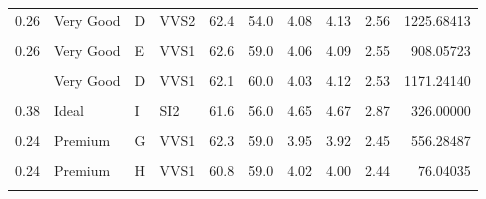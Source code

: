 \documentclass[
]{article}
\begin{document}
\begin{table}[!h]
{\begin{tabular}[t]{rlllrrrrrr}
0.26 & Very Good & D & VVS2 & 62.4 & 54.0 & 4.08 & 4.13 & 2.56 & 1225.68413\\
\cellcolor{gray!6}{0.26} & \cellcolor{gray!6}{Very Good} & \cellcolor{gray!6}{D} & \cellcolor{gray!6}{VVS2} & \cellcolor{gray!6}{62.8} & \cellcolor{gray!6}{60.0} & \cellcolor{gray!6}{4.01} & \cellcolor{gray!6}{4.05} & \cellcolor{gray!6}{2.53} & \cellcolor{gray!6}{1098.26967}\\
0.26 & Very Good & E & VVS1 & 62.6 & 59.0 & 4.06 & 4.09 & 2.55 & 908.05723\\
\cellcolor{gray!6}{0.26} & \cellcolor{gray!6}{Very Good} & \cellcolor{gray!6}{E} & \cellcolor{gray!6}{VVS1} & \cellcolor{gray!6}{63.4} & \cellcolor{gray!6}{59.0} & \cellcolor{gray!6}{4.00} & \cellcolor{gray!6}{4.04} & \cellcolor{gray!6}{2.55} & \cellcolor{gray!6}{914.08788}\\
\addlinespace
0.26 & Very Good & D & VVS1 & 62.1 & 60.0 & 4.03 & 4.12 & 2.53 & 1171.24140\\
\cellcolor{gray!6}{0.26} & \cellcolor{gray!6}{Ideal} & \cellcolor{gray!6}{E} & \cellcolor{gray!6}{VVS2} & \cellcolor{gray!6}{62.9} & \cellcolor{gray!6}{58.0} & \cellcolor{gray!6}{4.02} & \cellcolor{gray!6}{4.06} & \cellcolor{gray!6}{2.54} & \cellcolor{gray!6}{1015.49743}\\
0.38 & Ideal & I & SI2 & 61.6 & 56.0 & 4.65 & 4.67 & 2.87 & 326.00000\\
\cellcolor{gray!6}{0.26} & \cellcolor{gray!6}{Good} & \cellcolor{gray!6}{E} & \cellcolor{gray!6}{VVS1} & \cellcolor{gray!6}{57.9} & \cellcolor{gray!6}{60.0} & \cellcolor{gray!6}{4.22} & \cellcolor{gray!6}{4.25} & \cellcolor{gray!6}{2.45} & \cellcolor{gray!6}{885.36310}\\
0.24 & Premium & G & VVS1 & 62.3 & 59.0 & 3.95 & 3.92 & 2.45 & 556.28487\\
\addlinespace
\cellcolor{gray!6}{0.24} & \cellcolor{gray!6}{Premium} & \cellcolor{gray!6}{H} & \cellcolor{gray!6}{VVS1} & \cellcolor{gray!6}{61.2} & \cellcolor{gray!6}{58.0} & \cellcolor{gray!6}{4.01} & \cellcolor{gray!6}{3.96} & \cellcolor{gray!6}{2.44} & \cellcolor{gray!6}{89.33879}\\
0.24 & Premium & H & VVS1 & 60.8 & 59.0 & 4.02 & 4.00 & 2.44 & 76.04035\\
\cellcolor{gray!6}{0.24} & \cellcolor{gray!6}{Premium} & \cellcolor{gray!6}{H} & \cellcolor{gray!6}{VVS2} & \cellcolor{gray!6}{60.7} & \cellcolor{gray!6}{58.0} & \cellcolor{gray!6}{4.07} & \cellcolor{gray!6}{4.04} & \cellcolor{gray!6}{2.46} & \cellcolor{gray!6}{13.63949}\\

\end{tabular}}
\end{table}
\end{document}
